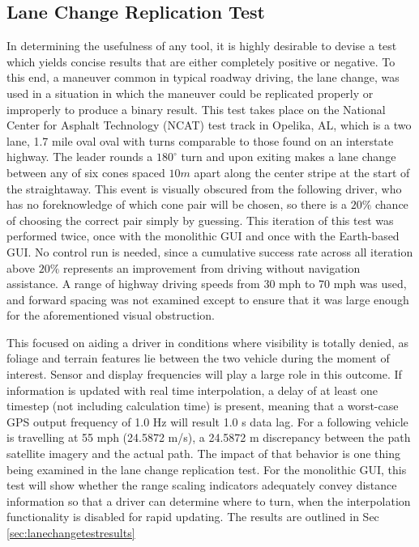 \documentclass[12pt]{report}
\begin{document}
\subsection{Lane Change Replication Test} \label{sec:lanechangetest}
In determining the usefulness of any tool, it is highly desirable to devise a test which yields concise results that are either completely positive or negative. To this end, a maneuver common in typical roadway driving, the lane change, was used in a situation in which the maneuver could be replicated properly or improperly to produce a binary result. This test takes place on the National Center for Asphalt Technology (NCAT) test track in Opelika, AL, which is a two lane, 1.7 mile oval oval with turns comparable to those found on an interstate highway. The leader rounds a $180^\circ$ turn and upon exiting makes a lane change between any of six cones spaced $10m$ apart along the center stripe at the start of the straightaway. This event is visually obscured from the following driver, who has no foreknowledge of which cone pair will be chosen, so there is a $20\%$ chance of choosing the correct pair simply by guessing. This iteration of this test was performed twice, once with the monolithic GUI and once with the Earth-based GUI. No control run is needed, since a cumulative success rate across all iteration above $20\%$ represents an improvement from driving without navigation assistance. A range of highway driving speeds from 30 mph to 70 mph was used, and forward spacing was not examined except to ensure that it was large enough for the aforementioned visual obstruction.

This focused on aiding a driver in conditions where visibility is totally denied, as foliage and terrain features lie between the two vehicle during the moment of interest. Sensor and display frequencies will play a large role in this outcome. If information is updated with real time interpolation, a delay of at least one timestep (not including calculation time) is present, meaning that a worst-case GPS output frequency of 1.0 Hz will result 1.0 s data lag. For a following vehicle is travelling at 55 mph (24.5872 m/s), a 24.5872 m discrepancy between the path satellite imagery and the actual path. The impact of that behavior is one thing being examined in the lane change replication test. For the monolithic GUI, this test will show whether the range scaling indicators adequately convey distance information so that a driver can determine where to turn, when the interpolation functionality is disabled for rapid updating. The results are outlined in Sec \ref{sec:lanechangetestresults}
\end{document}
